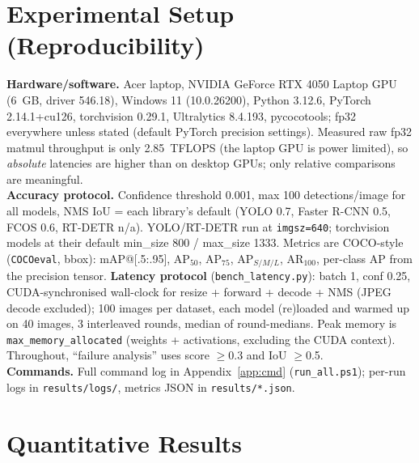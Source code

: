 \documentclass[10pt]{article}
\newcommand{\tb}[1]{\resizebox{\linewidth}{!}{#1}}
\newcommand{\code}[1]{\texttt{\small #1}}
\begin{document}
\begin{table}[h]\centering\footnotesize
\caption{Ground-truth statistics (computed by \code{extra\_analysis.py}). Heights in pixels of the \emph{original} image.}\label{tab:stats}
\tb{}
\end{table}

\section{Experimental Setup (Reproducibility)}
\textbf{Hardware/software.} Acer laptop, NVIDIA GeForce RTX 4050 Laptop GPU (6~GB, driver 546.18), Windows 11 (10.0.26200), Python 3.12.6, PyTorch 2.14.1+cu126, torchvision 0.29.1, Ultralytics 8.4.193, pycocotools; fp32 everywhere unless stated (default PyTorch precision settings). Measured raw fp32 matmul throughput is only 2.85~TFLOPS (the laptop GPU is power limited), so \emph{absolute} latencies are higher than on desktop GPUs; only relative comparisons are meaningful.\\
\textbf{Accuracy protocol.} Confidence threshold 0.001, max 100 detections/image for all models, NMS IoU = each library's default (YOLO 0.7, Faster R-CNN 0.5, FCOS 0.6, RT-DETR n/a). YOLO/RT-DETR run at \code{imgsz=640}; torchvision models at their default min\_size 800 / max\_size 1333. Metrics are COCO-style (\code{COCOeval}, bbox): mAP@[.5:.95], AP$_{50}$, AP$_{75}$, AP$_{S/M/L}$, AR$_{100}$, per-class AP from the precision tensor. \textbf{Latency protocol} (\code{bench\_latency.py}): batch 1, conf 0.25, CUDA-synchronised wall-clock for resize + forward + decode + NMS (JPEG decode excluded); 100 images per dataset, each model (re)loaded and warmed up on 40 images, 3 interleaved rounds, median of round-medians. Peak memory is \code{max\_memory\_allocated} (weights + activations, excluding the CUDA context). Throughout, ``failure analysis'' uses score $\ge$0.3 and IoU $\ge$0.5.\\
\textbf{Commands.} Full command log in Appendix~\ref{app:cmd} (\code{run\_all.ps1}); per-run logs in \code{results/logs/}, metrics JSON in \code{results/*.json}.

\section{Quantitative Results}
\begin{table}[h]\centering\footnotesize
\caption{Main accuracy results (\%). ``3 cls'' = person, car, truck. COCO 80-class numbers: YOLO11s 45.5 (official 47.0 at 300 dets), RT-DETR-L 52.6 (53.0), Faster R-CNN 37.2 (37.0), FCOS 39.2 (39.2).}\label{tab:main}
\tb{}
\end{table}
\end{document}
